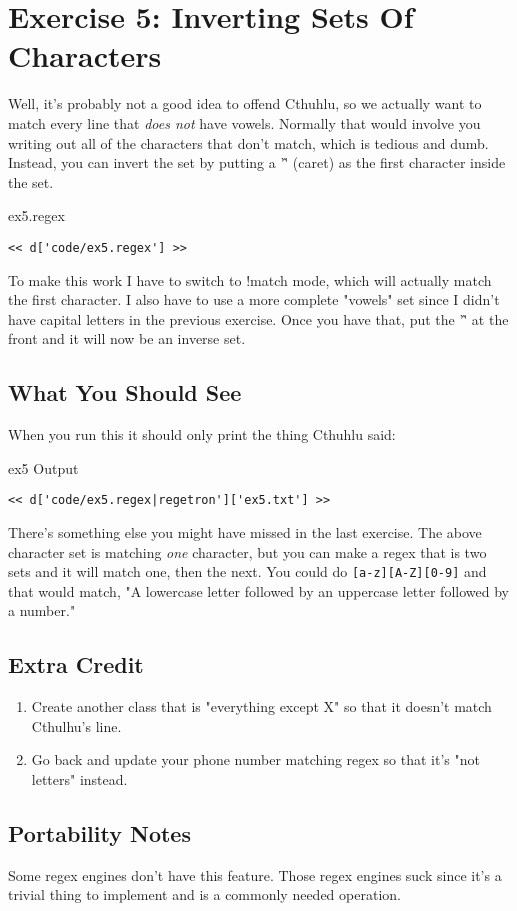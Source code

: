 \chapter{Exercise 5: Inverting Sets Of Characters}

Well, it's probably not a good idea to offend Cthuhlu, so we actually want
to match every line that \emph{does not} have vowels.  Normally that would
involve you writing out all of the characters that don't match, which is
tedious and dumb.  Instead, you can invert the set by putting a '\^' (caret)
as the first character inside the set.

\begin{code}{ex5.regex}
\begin{Verbatim}
<< d['code/ex5.regex'] >>
\end{Verbatim}
\end{code}

To make this work I have to switch to !match mode, which will actually
match the first character.  I also have to use a more complete "vowels"
set since I didn't have capital letters in the previous exercise.  Once
you have that, put the '\^' at the front and it will now be an inverse
set.

\section{What You Should See}

When you run this it should only print the thing Cthuhlu said:

\begin{code}{ex5 Output}
\begin{Verbatim}
<< d['code/ex5.regex|regetron']['ex5.txt'] >>
\end{Verbatim}
\end{code}

There's something else you might have missed in the last exercise.
The above character set is matching \emph{one} character, but you can
make a regex that is two sets and it will match one, then the next.
You could do \verb|[a-z][A-Z][0-9]| and that would match, "A lowercase
letter followed by an uppercase letter followed by a number."

\section{Extra Credit}

\begin{enumerate}
\item Create another class that is "everything except X" so that it
    doesn't match Cthulhu's line.
\item Go back and update your phone number matching regex so that it's
    "not letters" instead.
\end{enumerate}

\section{Portability Notes}

Some regex engines don't have this feature. Those regex engines suck
since it's a trivial thing to implement and is a commonly needed operation.

